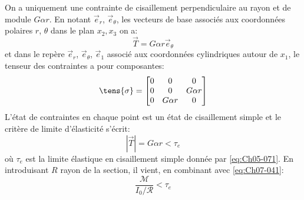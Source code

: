     On a uniquement une contrainte de cisaillement perpendiculaire au rayon et de module $G\alpha r$.
    En notant $\vec{e}_r$, $\vec{e}_{\theta}$, les vecteurs de base associés aux coordonnées polaires $r$, $\theta$ dans le plan $x_2,x_3$ on a:
\begin{equation}
    \vec{T} = G \alpha r \vec{e}_{\theta} 
    \label{eq:Ch07-043}
\end{equation}
et dans le repère $\vec{e}_r$, $\vec{e}_{\theta}$, $\vec{e}_{1}$ associé aux coordonnées cylindriques autour de $x_1$, le tenseur des contraintes a pour composantes:
\begin{equation}
    \tens{\sigma} = 
    \begin{bmatrix}
        0 & 0 & 0\\
        0 & 0 & G\alpha r\\
        0 & G\alpha r & 0
    \end{bmatrix}
    \label{eq:Ch07-044}
\end{equation}
L'état de contraintes en chaque point est un état de cisaillement simple et le critère de limite d'élasticité s'écrit:
\begin{equation}
    |\vec{T}| = G \alpha r < \tau_e    
    \label{eq:Ch07-045} 
\end{equation}
où $\tau_e$ est la limite élastique en cisaillement simple donnée par \eqref{eq:Ch05-071}.
En introduisant $R$ rayon de la section, il vient, en combinant avec \eqref{eq:Ch07-041}:
\begin{equation}
    \frac{\mathcal{M}}{I_0/\mathcal{R}} < \tau_e    
    \label{eq:Ch07-046} 
\end{equation}

